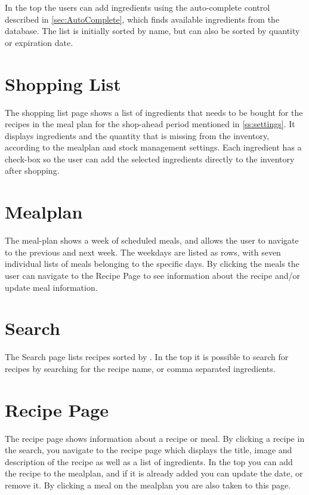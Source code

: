 In the top the users can add ingredients using the auto-complete control described in \cref{sec:AutoComplete}, which finds available ingredients from the database. The list is initially sorted by name, but can also be sorted by quantity or expiration date.

\section{Shopping List}
The shopping list page shows a list of ingredients that needs to be bought for the recipes in the meal plan for the shop-ahead period mentioned in \cref{ss:settings}. It displays ingredients and the quantity that is missing from the inventory, according to the mealplan and stock management settings. Each ingredient has a check-box so the user can add the selected ingredients directly to the inventory after shopping.

\section{Mealplan}
The meal-plan shows a week of scheduled meals, and allows the user to navigate to the previous and next week. The weekdays are listed as rows, with seven individual lists of meals belonging to the specific days. By clicking the meals the  user can navigate to the Recipe Page to see information about the recipe and/or update meal information.

\section{Search}
The Search page lists recipes sorted by .
In the top it is possible to search for recipes by searching for the recipe name, or comma separated ingredients.

\section{Recipe Page}
The recipe page shows information about a recipe or meal. By clicking a recipe in the search, you navigate to the recipe page which displays the title, image and description of the recipe as well as a list of ingredients. In the top you can add the recipe to the mealplan, and if it is already added you can update the date, or remove it.
By clicking a meal on the mealplan you are also taken to this page.

